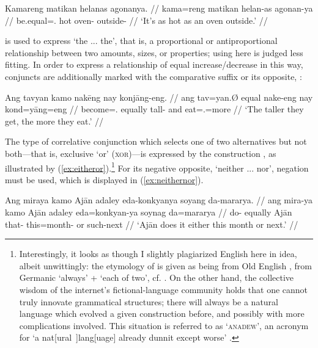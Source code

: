 \ex\label{ex:asas}
\begingl
	\gla Kamareng matikan helanas agonanya. //
	\glb kama=reng matikan helan-as agonan-ya //
	\glc be.equal=\TsgI{}.\Aarg{} hot oven-\Parg{} outside-\Loc{} //
	\glft `It's as hot as an oven outside.' //
\endgl
\xe


 is used to express `the ... the', that is, a 
proportional or antiproportional relationship between two amounts, sizes, 
or properties; using  here is judged less fitting. In 
order to express a relationship of equal increase/decrease in this way, 
conjuncts are additionally marked with the comparative suffix 
 or its opposite, :

\ex\label{ex:thethe}
\begingl
	\gla Ang tavyan kamo nakēng nay konjāng-eng. //
	\glb ang tav=yan.Ø equal nake-eng nay kond=yāng=eng //
	\glc \AgtT{} become=\TsgM{}.\Top{} equally tall-\Comp{} and 
		eat=\TsgM{}.\Aarg{}=more //
	\glft `The taller they get, the more they eat.' //
\endgl
\xe



The type of correlative conjunction which selects one of two alternatives but
not both---that is, exclusive `or' (\textsc{xor})---is expressed by the
construction , as illustrated
by (\ref{ex:eitheror}).\footnote{Interestingly, it looks as though I slightly
plagiarized English here in idea, albeit unwittingly: the etymology of
 is given as being from Old English , from
Germanic  `always' +  `each of two', cf.
\citet[either, adj. (and pron.) and adv. (and conj.)]{oed}. On the other hand,
the collective wisdom of the internet's fictional-language community holds that
one cannot truly innovate grammatical structures; there will always be a
natural language which evolved a given construction before, and possibly with
more complications involved. This situation is referred to as
`\textsc{anadew}', an acronym for `a nat[ural~]lang[uage] already dunnit except
worse' \citep{teoh2003}.} For its negative opposite, `neither ... nor',
negation must be used, which is displayed in (\ref{ex:neithernor}).

\pex\label{ex:eitheror}
\a\label{ex:eitherorvb}\begingl
	\gla Ang miraya kamo Ajān adaley eda-konkyanya soyang da-mararya. //
	\glb ang mira-ya kamo Ajān adaley eda=konkyan-ya soynag da=mararya //
	\glc \AgtT{} do-\TsgM{} equally Ajān that-\PargI{} this=month-\Loc{} 
		or such-next //
	\glft `Ajān does it either this month or next.' //
\endgl

